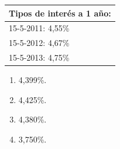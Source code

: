\documentclass[
  letterpaper,
  DIV=11,
  numbers=noendperiod]{scrreprt}
\begin{document}
\begin{longtable}[]{@{}l@{}}
\toprule()
Tipos de interés a 1 año: \\
\midrule()
\endhead
15-5-2011: 4,55\% \\
15-5-2012: 4,67\% \\
15-5-2013: 4,75\% \\
\bottomrule()
\end{longtable}

\begin{enumerate}
\def\labelenumi{\alph{enumi})}
\item
  4,399\%.
\item
  4,425\%.
\item
  4,380\%.
\item
  3,750\%.
\end{enumerate}
\end{document}

